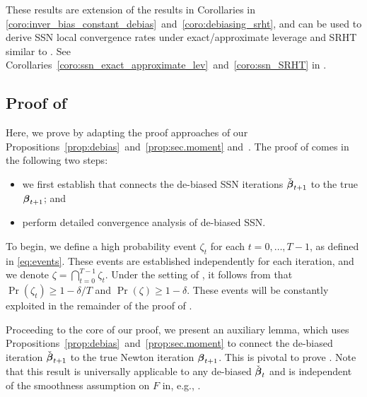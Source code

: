 \documentclass[11pt,a4paper]{article}
\begin{document}
These results are extension of the results in Corollaries in \ref{coro:inver_bias_constant_debias}~and~\ref{coro:debiasing_srht}, and can be used to derive SSN local convergence rates under exact/approximate leverage and SRHT similar to . 
See Corollaries~\ref{coro:ssn_exact_approximate_lev}~and~\ref{coro:ssn_SRHT} in .

\subsection{Proof of } 
\label{subsec:proof_convergence}

Here, we prove  by adapting the proof approaches of our Propositions~\ref{prop:debias}~and~\ref{prop:sec.moment} and~\citet[Theorem~10]{derezinski2021newtonless}. 
The proof of  comes in the following two steps: 
\begin{itemize}
    \item we first establish  that connects the de-biased SSN iterations $\check{\boldsymbol{\beta}}_{t+1}$ to the true $\boldsymbol{\beta}_{t+1}$; and
    \item perform detailed convergence analysis of de-biased SSN.
\end{itemize}

To begin, we define a high probability event $\zeta_t$ for each $t=0,\ldots, T-1$, as defined in \eqref{eq:events}. 
These events are established independently for each iteration, and we denote $\zeta=\bigcap^{T-1}_{t=0} \zeta_t$. 
Under the setting of , it follows from  that $\Pr(\zeta_t)\geq 1-\delta/T$ and $\Pr(\zeta)\geq 1-\delta$.  
These events will be constantly exploited in the remainder of the proof of . 


Proceeding to the core of our proof,  we present an auxiliary lemma, which uses Propositions~\ref{prop:debias}~and~\ref{prop:sec.moment} to connect the de-biased iteration $\check{\boldsymbol{\beta}}_{t+1}$ to the true Newton iteration $\boldsymbol{\beta}_{t+1}$. 
This is pivotal to prove .
Note that this result is universally applicable to any de-biased $\check{\boldsymbol{\beta}}_t$ and is independent of the smoothness assumption on $F$ in, e.g., .
 
\end{document}
